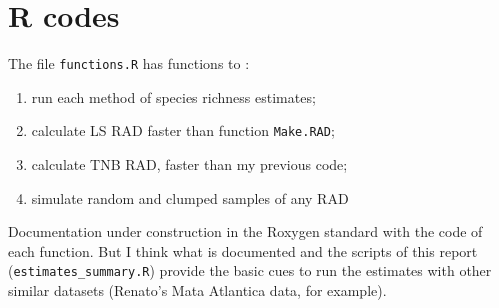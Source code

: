 \documentclass[12pt, A4]{article}\usepackage[]{graphicx}\usepackage[]{color}
\newcommand{\code}[1]{\texttt{#1}}
\begin{document}
\section{R codes}

\label{sec:r-codes}
 The file \code{functions.R} has functions to :
 \begin{enumerate}
 \item run each method of species richness estimates;
 \item calculate LS RAD faster than function \code{Make.RAD};
 \item calculate TNB RAD, faster than my previous code;
 \item simulate random and clumped samples of any RAD   
 \end{enumerate}
 
Documentation under construction in the Roxygen standard with the code of each function.
But I think what is documented and the scripts of this report (\code{estimates\_summary.R}) provide the basic cues
to run the estimates with other similar datasets (Renato's Mata Atlantica data, for example).



\end{document}
